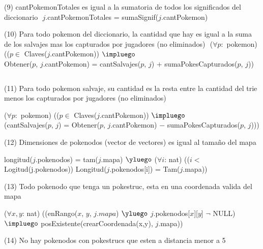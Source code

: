 \begin{Representacion}
(9) cantPokemonTotales es igual a la sumatoria de todos los significados del diccionario $ $\newline
$j$.cantPokemonTotales = sumaSignif($j$.cantPokemon)
$ $\newline

(10) Para todo pokemon del diccionario, la cantidad que hay es igual a la suma de los salvajes mas los capturados por jugadores (no eliminados) $ $\newline
($\forall p: $ pokemon) (($p \in$ Claves($j$.cantPokemon)) $\impluego$ \\
	Obtener($p$, $j$.cantPokemon) = cantSalvajes($p$, $j$) $+$ sumaPokesCapturados($p$, $j$))

$ $\newline

(11) Para todo pokemon salvaje, su cantidad es la resta entre la cantidad del trie menos los capturados por jugadores (no eliminados) $ $\newline

($\forall p: $ pokemon) (($p \in$ Claves($j$.cantPokemon)) $\impluego$ \\ 
	(cantSalvajes($p$, $j$) = Obtener($p$, $j$.cantPokemon) $-$ sumaPokesCapturados($p$, $j$)))
$ $\newline


(12) Dimensiones de pokenodos (vector de vectores) es igual al tama\~no del mapa $ $\newline

longitud($j$.pokenodos) = tam($j$.mapa) $\yluego$ 
($\forall i$: nat) (($i <$ Logitud(j.pokenodos)) Longitud($j$.pokenodos[i]) = Tam($j$.mapa)) 
$ $\newline

(13) Todo pokenodo que tenga un pokestruc, esta en una coordenada valida del mapa $ $\newline

($\forall x, y$: nat) ((enRango($x$, $y$, $j.mapa$) $\yluego$ $j$.pokenodos[$x$][$y$] $\neg$ NULL) \\
	$\impluego$ posExistente(crearCoordenada(x,y), $j$.mapa))
$ $\newline


(14) No hay pokenodos con pokestrucs que esten a distancia menor a 5 $ $\newline


\end{Representacion}
